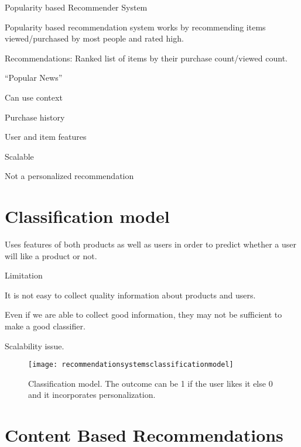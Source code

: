 Popularity based Recommender System
	\begin{bulletedlist}
		\item Popularity based recommendation system works by recommending items viewed/pur\-chased by most people and rated high.
		\item Recommendations: Ranked list of items by their purchase count/viewed count.
		\item``Popular News''
		\begin{bulletedlist}
			\item Can use context
			\item Purchase history
			\item User and item features
			\item Scalable
		\end{bulletedlist}
		\item Not a personalized recommendation
	\end{bulletedlist}

	\section{Classification model}
	\begin{bulletedlist}
		\item Uses features of both products as well as users in order to predict whether a user will like a product or not.
		\item Limitation
		\begin{numberedlist}
			\item It is not easy to collect quality information about products and users.
			\item Even if we are able to collect good information, they may not be sufficient to make a good classifier.
			\item Scalability issue.
		\end{numberedlist}
	\end{bulletedlist}

	\begin{figure}[tbh]
		\centering
		\texttt{[image: recommendationsystemsclassificationmodel]}
		\caption[Classification model]{Classification model.  The outcome can be 1 if the user likes it else 0 and it incorporates personalization.}
		\label{fig:recommendationsystemsclassificationmodel}
	\end{figure}

	\section{Content Based Recommendations}

